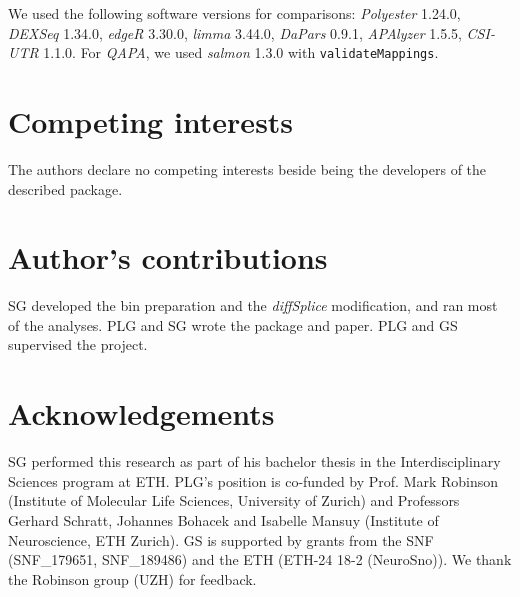 \documentclass{bmcart}
\begin{document}
We used the following software versions for comparisons: \textit{Polyester} 1.24.0, \textit{DEXSeq} 1.34.0, \textit{edgeR} 3.30.0, \textit{limma} 3.44.0, \textit{DaPars} 0.9.1, \textit{APAlyzer} 1.5.5, \textit{CSI-UTR} 1.1.0. For \textit{QAPA}, we used \textit{salmon} 1.3.0 with \texttt{validateMappings}.



\begin{backmatter}

\section*{Competing interests}
  The authors declare no competing interests beside being the developers of the described package.

\section*{Author's contributions}
  SG developed the bin preparation and the \textit{diffSplice} modification, and ran most of the analyses. PLG and SG wrote the package and paper. PLG and GS supervised the project.

\section*{Acknowledgements}
  SG performed this research as part of his bachelor thesis in the Interdisciplinary Sciences program at ETH. PLG's position is co-funded by Prof. Mark Robinson (Institute of Molecular Life Sciences, University of Zurich) and Professors Gerhard Schratt, Johannes Bohacek and Isabelle Mansuy (Institute of Neuroscience, ETH Zurich). GS is supported by grants from the SNF (SNF\_179651, SNF\_189486) and the ETH (ETH-24 18-2 (NeuroSno)). We thank the Robinson group (UZH) for feedback.



\end{backmatter}
\end{document}
